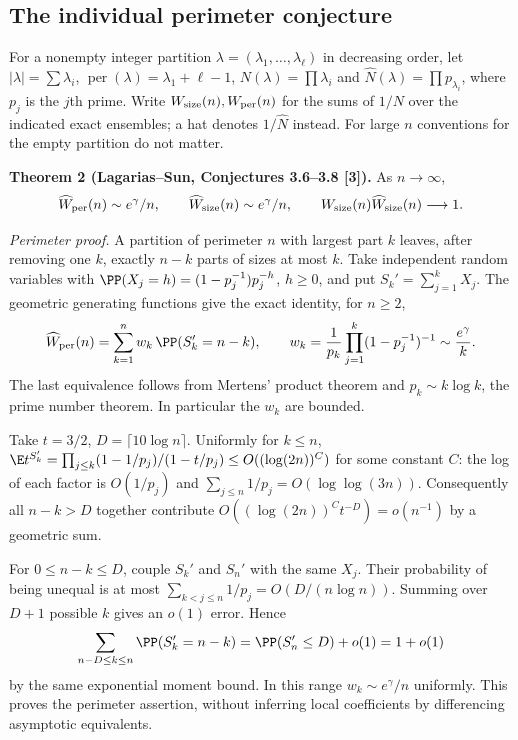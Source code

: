 \documentclass[11pt,a4paper]{article}
\numberwithin{equation}{section}
\theoremstyle{definition}
\theoremstyle{remark}
\begin{document}
\subsection*{The individual perimeter conjecture}
For a nonempty integer partition $\lambda=(\lambda_1,\ldots,\lambda_\ell)$ in decreasing order, let $|\lambda|=\sum\lambda_i$, $\operatorname{per}(\lambda)=\lambda_1+\ell-1$, $N(\lambda)=\prod\lambda_i$ and $\widehat N(\lambda)=\prod p_{\lambda_i}$, where $p_j$ is the $j$th prime. Write $W_{\rm size}(n),W_{\rm per}(n)$ for the sums of $1/N$ over the indicated exact ensembles; a hat denotes $1/\widehat N$ instead. For large $n$ conventions for the empty partition do not matter.

\textbf{Theorem 2 (Lagarias--Sun, Conjectures 3.6--3.8 [3]).} As $n\to\infty$,
\[
 \widehat W_{\rm per}(n)\sim e^\gamma/n,\qquad
 \widehat W_{\rm size}(n)\sim e^\gamma/n,\qquad
 W_{\rm size}(n)\widehat W_{\rm size}(n)\longrightarrow1 .
\]

\textit{Perimeter proof.} A partition of perimeter $n$ with largest part $k$ leaves, after removing one $k$, exactly $n-k$ parts of sizes at most $k$. Take independent random variables with $\PP(X_j=h)=(1-p_j^{-1})p_j^{-h}$, $h\ge0$, and put $S_k'=\sum_{j=1}^k X_j$. The geometric generating functions give the exact identity, for $n\ge2$,
\[
 \widehat W_{\rm per}(n)=\sum_{k=1}^n w_k\,\PP(S_k'=n-k),\qquad
 w_k=\frac1{p_k}\prod_{j=1}^k(1-p_j^{-1})^{-1}\sim\frac{e^\gamma}{k}.
\]
The last equivalence follows from Mertens' product theorem and $p_k\sim k\log k$, the prime number theorem. In particular the $w_k$ are bounded.

Take $t=3/2$, $D=\lceil10\log n\rceil$. Uniformly for $k\le n$, $\E t^{S_k'}=\prod_{j\le k}(1-1/p_j)/(1-t/p_j)\le O((\log(2n))^C)$ for some constant $C$: the log of each factor is $O(1/p_j)$ and $\sum_{j\le n}1/p_j=O(\log\log(3n))$. Consequently all $n-k>D$ together contribute $O((\log(2n))^C t^{-D})=o(n^{-1})$ by a geometric sum.

For $0\le n-k\le D$, couple $S_k'$ and $S_n'$ with the same $X_j$. Their probability of being unequal is at most $\sum_{k<j\le n}1/p_j=O(D/(n\log n))$. Summing over $D+1$ possible $k$ gives an $o(1)$ error. Hence
\[
 \sum_{n-D\le k\le n}\PP(S_k'=n-k)
 =\PP(S_n'\le D)+o(1)=1+o(1)
\]
by the same exponential moment bound. In this range $w_k\sim e^\gamma/n$ uniformly. This proves the perimeter assertion, without inferring local coefficients by differencing asymptotic equivalents.
\end{document}
